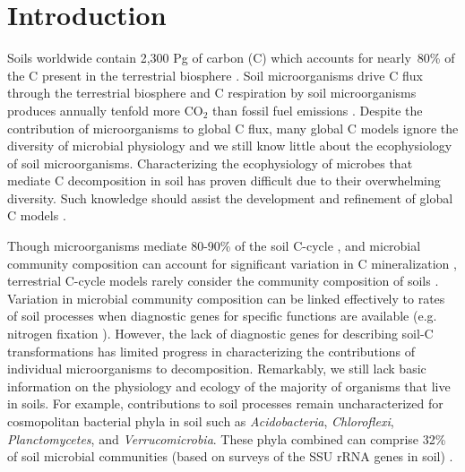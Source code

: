 \section{Introduction}
Soils worldwide contain 2,300 Pg of carbon (C) which accounts for nearly~80\%
of the C present in the terrestrial biosphere
\citep{Amundson_2001,BATJES_1996}. Soil microorganisms drive C flux through the
terrestrial biosphere and C respiration by soil microorganisms
produces annually tenfold more CO$_{2}$ than fossil fuel emissions
\citep{chapin2002principles}. Despite the contribution of microorganisms to
global C flux, many global C models ignore the diversity of microbial
physiology \citep{Allison2010,Six2006,Treseder2011} and we still know little
about the ecophysiology of soil microorganisms. Characterizing the
ecophysiology of microbes that mediate C decomposition in soil has proven
difficult due to their overwhelming diversity. Such knowledge should assist
the development and refinement of global C models
\citep{Bradford2008,Neff_2001,McGuire2010,Wieder2013}.

Though microorganisms mediate 80-90\% of the soil C-cycle
\citep{ColemanCrossley_1996,Nannipieri_2003}, and microbial community
composition can account for significant variation in C mineralization
\citep{Strickland_2009}, terrestrial C-cycle models rarely consider the
community composition of soils \citep{Zak2006,Reed2007}. Variation in microbial
community composition can be linked effectively to rates of soil processes when
diagnostic genes for specific functions are available (e.g. nitrogen fixation
\citep{Hsu2009}).  However, the lack of diagnostic genes for describing soil-C
transformations has limited progress in characterizing the contributions of
individual microorganisms to decomposition. Remarkably, we still lack basic
information on the physiology and ecology of the majority of organisms that
live in soils. For example, contributions to soil processes remain
uncharacterized for cosmopolitan bacterial phyla in soil such as
\textit{Acidobacteria}, \textit{Chloroflexi}, \textit{Planctomycetes}, and
\textit{Verrucomicrobia}. These phyla combined can comprise 32\% of soil
microbial communities (based on surveys of the SSU rRNA genes in soil)
\citep{Janssen2006,Buckley2002}. 

